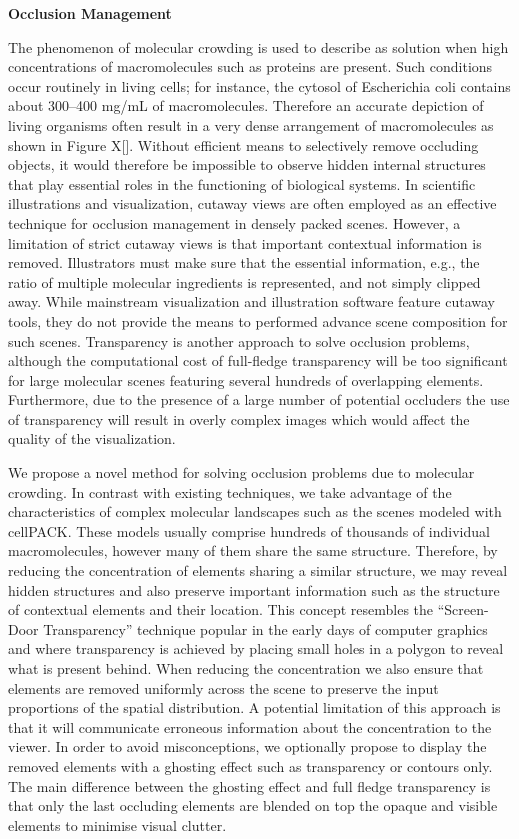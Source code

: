 \textbf{Occlusion Management}

The phenomenon of molecular crowding is used to describe as solution when high concentrations of macromolecules such as proteins are present.
Such conditions occur routinely in living cells; for instance, the cytosol of Escherichia coli contains about 300–400 mg/mL of macromolecules.
Therefore an accurate depiction of living organisms often result in a very dense arrangement of macromolecules as shown in Figure X[].
Without efficient means to selectively remove occluding objects, it would therefore be impossible to observe hidden internal structures that play essential roles in the functioning of biological systems.
In scientific illustrations and visualization, cutaway views are often employed as an effective technique for occlusion management in densely packed scenes.
However, a limitation of strict cutaway views is that important contextual information is removed.
Illustrators must make sure that the essential information, e.g., the ratio of multiple molecular ingredients is represented, and not simply clipped away.
While mainstream visualization and illustration software feature cutaway tools, they do not provide the means to performed advance scene composition for such scenes.
Transparency is another approach to solve occlusion problems, although the computational cost of full-fledge transparency will be too significant for large molecular scenes featuring several hundreds of overlapping elements.
Furthermore, due to the presence of a large number of potential occluders the use of transparency will result in overly complex images which would affect the quality of the visualization.

We propose a novel method for solving occlusion problems due to molecular crowding.
In contrast with existing techniques, we take advantage of the characteristics of complex molecular landscapes such as the scenes modeled with cellPACK.
These models usually comprise hundreds of thousands of individual macromolecules, however many of them share the same structure.
Therefore, by reducing the concentration of elements sharing a similar structure, we may reveal hidden structures and also preserve important information such as the structure of contextual elements and their location.
This concept resembles the “Screen-Door Transparency” technique popular in the early days of computer graphics and where transparency is achieved by placing small holes in a polygon to reveal what is present behind.
When reducing the concentration we also ensure that elements are removed uniformly across the scene to preserve the input proportions of the spatial distribution.
A potential limitation of this approach is that it will communicate erroneous information about the concentration to the viewer.
In order to avoid misconceptions, we optionally propose to display the removed elements with a ghosting effect such as transparency or contours only.
The main difference between the ghosting effect and full fledge transparency is that only the last occluding elements are blended on top the opaque and visible elements to minimise visual clutter.

